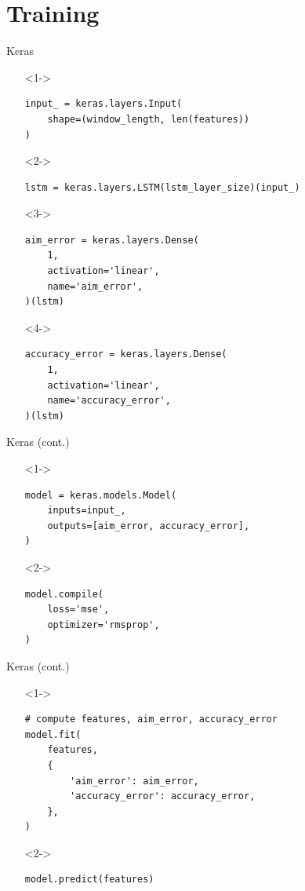 \documentclass[table]{beamer}
\begin{document}
\section{Training}

\begin{frame}[fragile]{Keras}
  \begin{itemize}
  \item[]<1-> \begin{verbatim}
input_ = keras.layers.Input(
    shape=(window_length, len(features))
)
    \end{verbatim}
  \item[]<2-> \begin{verbatim}
lstm = keras.layers.LSTM(lstm_layer_size)(input_)
    \end{verbatim}
  \item[]<3-> \begin{verbatim}
aim_error = keras.layers.Dense(
    1,
    activation='linear',
    name='aim_error',
)(lstm)
    \end{verbatim}
  \item[]<4-> \begin{verbatim}
accuracy_error = keras.layers.Dense(
    1,
    activation='linear',
    name='accuracy_error',
)(lstm)
    \end{verbatim}
  \end{itemize}
\end{frame}

\begin{frame}[fragile]{Keras (cont.)}
  \begin{itemize}
  \item[]<1-> \begin{verbatim}
model = keras.models.Model(
    inputs=input_,
    outputs=[aim_error, accuracy_error],
)
    \end{verbatim}
  \item[]<2-> \begin{verbatim}
model.compile(
    loss='mse',
    optimizer='rmsprop',
)
    \end{verbatim}
  \end{itemize}
\end{frame}

\begin{frame}[fragile]{Keras (cont.)}
  \begin{itemize}
  \item[]<1-> \begin{verbatim}
# compute features, aim_error, accuracy_error
model.fit(
    features,
    {
        'aim_error': aim_error,
        'accuracy_error': accuracy_error,
    },
)
    \end{verbatim}
  \item[]<2-> \begin{verbatim}
model.predict(features)
    \end{verbatim}
  \end{itemize}
\end{frame}
\end{document}
